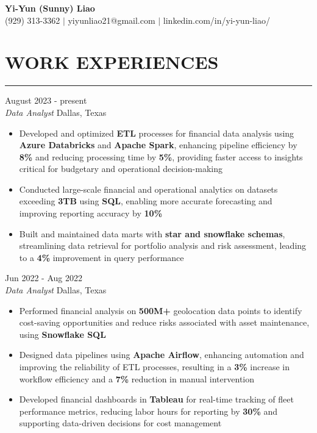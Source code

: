 \documentclass[11pt,letterpaper]{article}
\begin{document}
\begin{center}
  {\Large\textbf{Yi-Yun (Sunny) Liao}}\\[-2pt]
  (929) 313-3362 $|$ yiyunliao21@gmail.com $|$ linkedin.com/in/yi-yun-liao/
\end{center}

\vspace{-6pt}  %
\section*{WORK EXPERIENCES}
\vspace{-8pt}\noindent\rule{\textwidth}{0.8pt}

\vspace{2pt}
 \hfill August 2023 - present\\[-1pt]
\textit{Data Analyst} \hfill Dallas, Texas
\begin{itemize}[leftmargin=1.5em, rightmargin=0pt, itemsep=-1pt, topsep=0pt, parsep=0pt]
  \item \justifying Developed and optimized \textbf{ETL} processes for financial data analysis using \textbf{Azure Databricks} and \textbf{Apache Spark}, enhancing pipeline efficiency by \textbf{8\%} and reducing processing time by \textbf{5\%}, providing faster access to insights critical for budgetary and operational decision-making
  \item \justifying Conducted large-scale financial and operational analytics on datasets exceeding \textbf{3TB} using \textbf{SQL}, enabling more accurate forecasting and improving reporting accuracy by \textbf{10\%}
  \item \justifying Built and maintained data marts with \textbf{star and snowflake schemas}, streamlining data retrieval for portfolio analysis and risk assessment, leading to a \textbf{4\%} improvement in query performance
\end{itemize}

\vspace{0.3\baselineskip}  %
 \hfill Jun 2022 - Aug 2022\\[-1pt]
\textit{Data Analyst} \hfill Dallas, Texas
\begin{itemize}[leftmargin=1.5em, rightmargin=0pt, itemsep=-1pt, topsep=0pt, parsep=0pt]
  \item \justifying Performed financial analysis on \textbf{500M+} geolocation data points to identify cost-saving opportunities and reduce risks associated with asset maintenance, using \textbf{Snowflake SQL}
  \item \justifying Designed data pipelines using \textbf{Apache Airflow}, enhancing automation and improving the reliability of ETL processes, resulting in a \textbf{3\%} increase in workflow efficiency and a \textbf{7\%} reduction in manual intervention
  \item \justifying Developed financial dashboards in \textbf{Tableau} for real-time tracking of fleet performance metrics, reducing labor hours for reporting by \textbf{30\%} and supporting data-driven decisions for cost management
\end{itemize}
\end{document}
